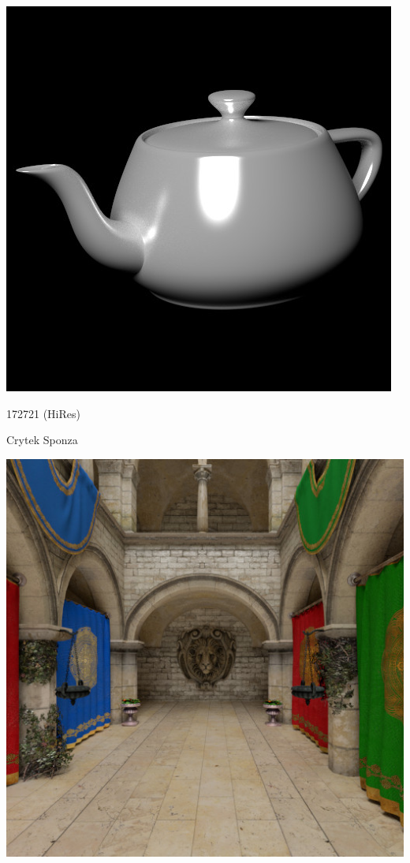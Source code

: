 \documentclass[utf8,stillsansserifmath,fleqn,t]{beamer}
\begin{document}
\begin{frame}[label=acceleration-1]
\begin{minipage}{.23\textwidth}
\centerline{\includegraphics[width=\textwidth]{./fig/trianglecount-teapot.jpg}}
\centerline{172721 (HiRes)}
\end{minipage}\hfill
\begin{minipage}{.23\textwidth}
\centerline{Crytek Sponza}
\centerline{\includegraphics[width=\textwidth]{./fig/trianglecount-sponza.jpg}}

\end{minipage}
\end{frame}
\end{document}
